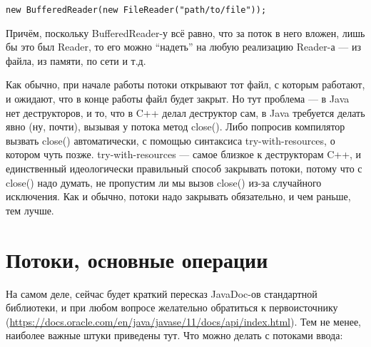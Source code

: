 \documentclass[a5paper]{article}
\begin{document}
\begin{verbatim}
new BufferedReader(new FileReader("path/to/file"));
\end{verbatim}

Причём, поскольку BufferedReader-у всё равно, что за поток в него вложен, лишь бы это был Reader, то его можно ``надеть'' на любую реализацию Reader-а --- из файла, из памяти, по сети и т.д.

Как обычно, при начале работы потоки открывают тот файл, с которым работают, и ожидают, что в конце работы файл будет закрыт. Но тут проблема --- в Java нет деструкторов, и то, что в C++ делал деструктор сам, в Java требуется делать явно (ну, почти), вызывая у потока метод close(). Либо попросив компилятор вызвать close() автоматически, с помощью синтаксиса try-with-resources, о котором чуть позже. try-with-resources --- самое близкое к деструкторам C++, и единственный идеологически правильный способ закрывать потоки, потому что с close() надо думать, не пропустим ли мы вызов close() из-за случайного исключения. Как и обычно, потоки надо закрывать обязательно, и чем раньше, тем лучше.

\section{Потоки, основные операции}

На самом деле, сейчас будет краткий пересказ JavaDoc-ов стандартной библиотеки, и при любом вопросе желательно обратиться к первоисточнику (\url{https://docs.oracle.com/en/java/javase/11/docs/api/index.html}). Тем не менее, наиболее важные штуки приведены тут. Что можно делать с потоками ввода:
\end{document}
